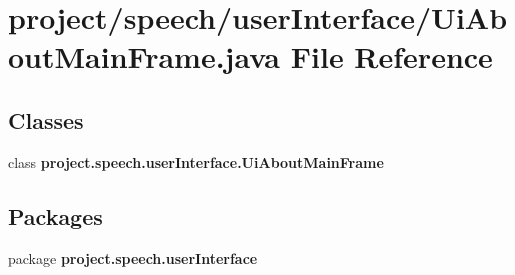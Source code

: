 \section{project/speech/user\+Interface/\+Ui\+About\+Main\+Frame.java File Reference}
\label{_ui_about_main_frame_8java}
\subsection*{Classes}
\begin{DoxyCompactItemize}
\item 
class {\bf project.\+speech.\+user\+Interface.\+Ui\+About\+Main\+Frame}
\end{DoxyCompactItemize}
\subsection*{Packages}
\begin{DoxyCompactItemize}
\item 
package {\bf project.\+speech.\+user\+Interface}
\end{DoxyCompactItemize}
